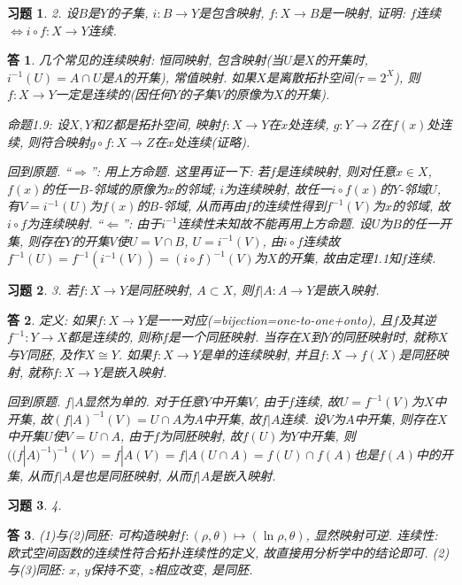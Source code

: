 \documentclass{ctexart}%
\newtheorem*{exercise}{习题}
\newtheorem*{solution}{答}
\theoremstyle{definition}
\theoremstyle{remark}
\begin{document}
\begin{exercise}2. 设$B$是$Y$的子集, $i:B\rightarrow Y$是包含映射, $f:X\rightarrow B$是一映射, 证明: $f$连续$\Longleftrightarrow i\circ f: X\rightarrow Y$连续.
\end{exercise}
\begin{solution}
几个常见的连续映射: 恒同映射, 包含映射(当$U$是$X$的开集时, $i^{-1}(U)=A\cap U$是$A$的开集), 常值映射. 如果$X$是离散拓扑空间($\tau=2^X$), 则$f:X\rightarrow Y$一定是连续的(因任何$Y$的子集$V$的原像为$X$的开集). 

命题1.9: 设$X,Y$和$Z$都是拓扑空间, 映射$f:X\rightarrow Y$在$x$处连续, $g: Y\rightarrow Z$在$f(x)$处连续, 则符合映射$g\circ f:X\rightarrow Z$在$x$处连续(证略). 

回到原题. ``$\Longrightarrow$'': 用上方命题. 这里再证一下: 若$f$是连续映射, 则对任意$x\in X$,$f(x)$的任一$B$-邻域的原像为$x$的邻域; $i$为连续映射, 故任一$i\circ f(x)$的$Y$-邻域$U$, 有$V=i^{-1}(U)$为$f(x)$的$B$-邻域, 从而再由$f$的连续性得到$f^{-1}(V)$为$x$的邻域, 故$i\circ f$为连续映射. ``$\Longleftarrow$'': 由于$i^{-1}$连续性未知故不能再用上方命题. 设$U$为$B$的任一开集, 则存在$Y$的开集$V$使$U=V\cap B$, $U=i^{-1}(V)$, 由$i\circ f$连续故$f^{-1}(U)=f^{-1}(i^{-1}(V))=(i\circ f)^{-1}(V)$为$X$的开集, 故由定理1.1知$f$连续.
\end{solution}

\begin{exercise}3. 若$f:X\rightarrow Y$是同胚映射, $A\subset X$, 则$f|A:A\rightarrow Y$是嵌入映射. 
\end{exercise}
\begin{solution}
定义: 如果$f:X\rightarrow Y$是一一对应(=bijection=one-to-one+onto), 且$f$及其逆$f^{-1}:Y\rightarrow X$都是连续的, 则称$f$是一个同胚映射. 当存在$X$到$Y$的同胚映射时, 就称$X$与$Y$同胚, 及作$X\cong Y$. 如果$f:X\rightarrow Y$是单的连续映射, 并且$f: X\rightarrow f(X)$是同胚映射, 就称$f: X\rightarrow Y$是嵌入映射.

回到原题. $f|A$显然为单的. 对于任意$Y$中开集$V$, 由于$f$连续, 故$U=f^{-1}(V)$为$X$中开集, 故$(f|A)^{-1}(V)=U\cap A$为$A$中开集, 故$f|A$连续. 设$V$为$A$中开集, 则存在$X$中开集$U$使$V=U\cap A$, 由于$f$为同胚映射, 故$f(U)$为$Y$中开集, 则$ ((f|A)^{-1})^{-1}(V)=f|A(V)=f|A(U\cap A)=f(U)\cap f(A)$也是$f(A)$中的开集, 从而$f|A$是也是同胚映射, 从而$f|A$是嵌入映射.  
\end{solution}

\begin{exercise}4.
\end{exercise}
\begin{solution}(1)与(2)同胚: 可构造映射$f: (\rho,\theta)\mapsto (\ln \rho, \theta)$, 显然映射可逆. 连续性: 欧式空间函数的连续性符合拓扑连续性的定义, 故直接用分析学中的结论即可. (2)与(3)同胚: $x$, $y$保持不变, $z$相应改变, 是同胚.
\end{solution}
\end{document}
